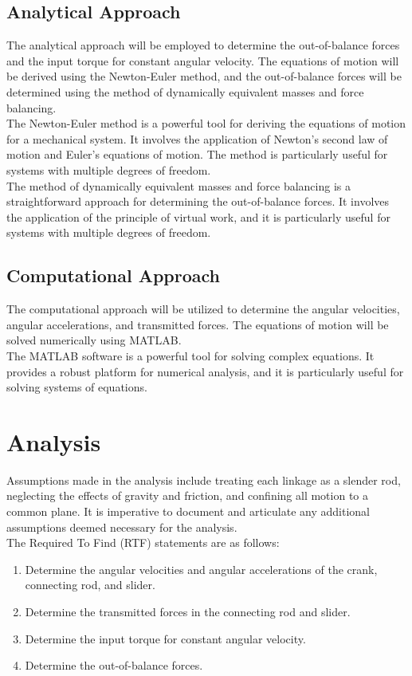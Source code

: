 \documentclass[12pt, titlepage]{article}
\begin{document}
\subsection{Analytical Approach}
The analytical approach will be employed to determine the out-of-balance forces
and the input torque for constant angular velocity. The equations of motion
will be derived using the Newton-Euler method, and the out-of-balance forces
will be determined using the method of dynamically equivalent masses and 
force balancing.\\[10pt]
The Newton-Euler method is a powerful tool for deriving the equations of motion
for a mechanical system. It involves the application of Newton's second law of
motion and Euler's equations of motion. The method is particularly useful for
systems with multiple degrees of freedom.\\[10pt]
The method of dynamically equivalent masses and force balancing is a
straightforward approach for determining the out-of-balance forces. It involves
the application of the principle of virtual work, and it is particularly useful
for systems with multiple degrees of freedom.
\subsection{Computational Approach}
The computational approach will be utilized to determine the angular
velocities, angular accelerations, and transmitted forces. The equations of
motion will be solved numerically using MATLAB.\\[10pt]
The MATLAB software is a powerful tool for solving complex equations. It
provides a robust platform for numerical analysis, and it is particularly
useful for solving systems of equations.
\newpage
\section{Analysis}
Assumptions made in the analysis include treating each linkage as a slender
rod, neglecting the effects of gravity and friction, and confining all motion
to a common plane. It is imperative to document and articulate any additional
assumptions deemed necessary for the analysis.\\[10pt]
The Required To Find (RTF) statements are as follows:
\begin{enumerate}
    \item Determine the angular velocities and angular accelerations of the
      crank, connecting rod, and slider.
    \item Determine the transmitted forces in the connecting rod and slider.
    \item Determine the input torque for constant angular velocity.
    \item Determine the out-of-balance forces.
\end{enumerate}
\end{document}
